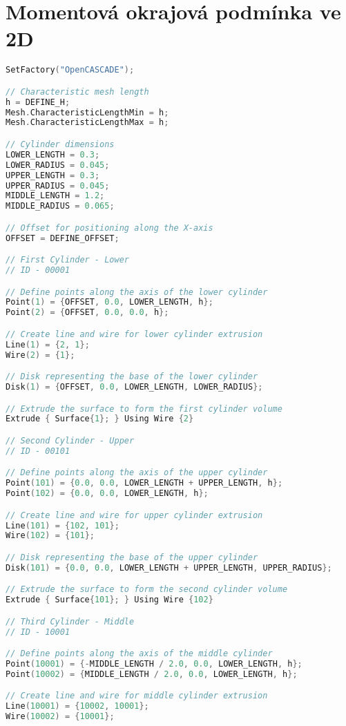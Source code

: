\chapter{Momentová okrajová podmínka ve 2D}\label{appendix A}

\begin{lstlisting}[language=C++]
SetFactory("OpenCASCADE");

// Characteristic mesh length
h = DEFINE_H;
Mesh.CharacteristicLengthMin = h;
Mesh.CharacteristicLengthMax = h;

// Cylinder dimensions
LOWER_LENGTH = 0.3;
LOWER_RADIUS = 0.045;
UPPER_LENGTH = 0.3;
UPPER_RADIUS = 0.045;
MIDDLE_LENGTH = 1.2;
MIDDLE_RADIUS = 0.065;

// Offset for positioning along the X-axis
OFFSET = DEFINE_OFFSET;

// First Cylinder - Lower 
// ID - 00001 

// Define points along the axis of the lower cylinder
Point(1) = {OFFSET, 0.0, LOWER_LENGTH, h};
Point(2) = {OFFSET, 0.0, 0.0, h};

// Create line and wire for lower cylinder extrusion
Line(1) = {2, 1};
Wire(2) = {1};

// Disk representing the base of the lower cylinder
Disk(1) = {OFFSET, 0.0, LOWER_LENGTH, LOWER_RADIUS};

// Extrude the surface to form the first cylinder volume
Extrude { Surface{1}; } Using Wire {2}

// Second Cylinder - Upper
// ID - 00101

// Define points along the axis of the upper cylinder
Point(101) = {0.0, 0.0, LOWER_LENGTH + UPPER_LENGTH, h};
Point(102) = {0.0, 0.0, LOWER_LENGTH, h};

// Create line and wire for upper cylinder extrusion
Line(101) = {102, 101};
Wire(102) = {101};

// Disk representing the base of the upper cylinder
Disk(101) = {0.0, 0.0, LOWER_LENGTH + UPPER_LENGTH, UPPER_RADIUS};

// Extrude the surface to form the second cylinder volume
Extrude { Surface{101}; } Using Wire {102}

// Third Cylinder - Middle
// ID - 10001

// Define points along the axis of the middle cylinder
Point(10001) = {-MIDDLE_LENGTH / 2.0, 0.0, LOWER_LENGTH, h};
Point(10002) = {MIDDLE_LENGTH / 2.0, 0.0, LOWER_LENGTH, h};

// Create line and wire for middle cylinder extrusion
Line(10001) = {10002, 10001};
Wire(10002) = {10001};


\end{lstlisting}
